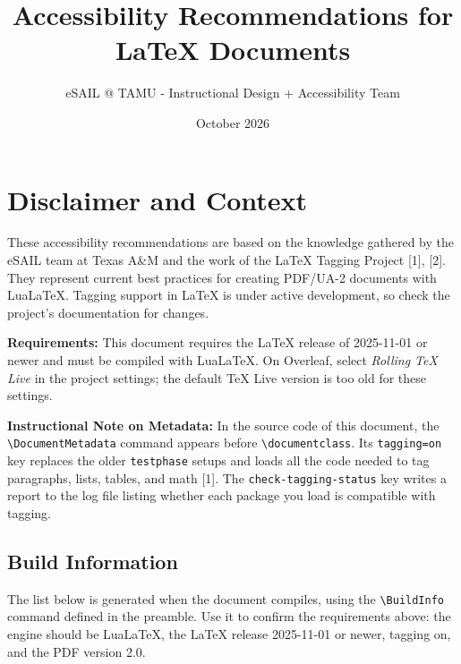 \documentclass[11pt]{article}
\title{Accessibility Recommendations for LaTeX Documents}
\author{eSAIL @ TAMU - Instructional Design + Accessibility Team}
\date{October 2026}
\begin{document}
\sloppy %

\maketitle

\section{Disclaimer and Context}

These accessibility recommendations are based on the knowledge gathered by the eSAIL team at Texas A\&M and the work of the LaTeX Tagging Project [1], [2]. They represent current best practices for creating PDF/UA-2 documents with LuaLaTeX. Tagging support in LaTeX is under active development, so check the project's documentation for changes.

\textbf{Requirements:} This document requires the LaTeX release of 2025-11-01 or newer and must be compiled with LuaLaTeX. On Overleaf, select \emph{Rolling TeX Live} in the project settings; the default TeX Live version is too old for these settings.

\textbf{Instructional Note on Metadata:} In the source code of this document, the \texttt{\textbackslash DocumentMetadata} command appears before \texttt{\textbackslash documentclass}. Its \texttt{tagging=on} key replaces the older \texttt{testphase} setups and loads all the code needed to tag paragraphs, lists, tables, and math [1]. The \texttt{check-tagging-status} key writes a report to the log file listing whether each package you load is compatible with tagging.

\subsection{Build Information}
The list below is generated when the document compiles, using the \verb|\BuildInfo| command defined in the preamble. Use it to confirm the requirements above: the engine should be LuaLaTeX, the LaTeX release 2025-11-01 or newer, tagging on, and the PDF version 2.0.
\BuildInfo

\end{document}
